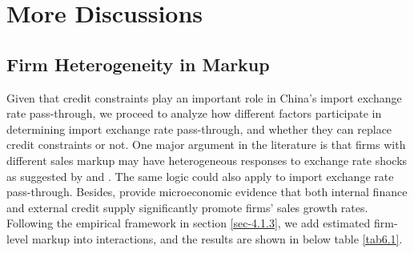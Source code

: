 \chapter{More Discussions}\label{sec-6.discussion}

\section{Firm Heterogeneity in Markup}

Given that credit constraints play an important role in China's import exchange rate pass-through, we proceed to analyze how different factors participate in determining import exchange rate pass-through, and whether they can replace credit constraints or not. One major argument in the literature is that firms with different sales markup may have heterogeneous responses to exchange rate shocks as suggested by \cite{bmm2012} and \cite{lmx2015}. The same logic could also apply to import exchange rate pass-through. Besides, \cite{llz2018} provide microeconomic evidence that both internal finance and external credit supply significantly promote firms' sales growth rates. Following the empirical framework in section \ref{sec-4.1.3}, we add estimated firm-level markup into interactions, and the results are shown in below table \ref{tab6.1}.

